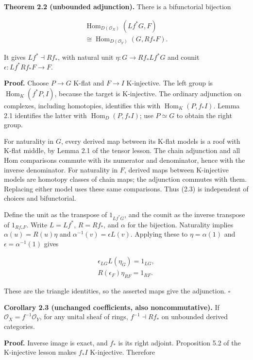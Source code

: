 \documentclass[
  english,
  11pt,
  a4paper,
]{article}
\begin{document}
\textbf{Theorem 2.2 (unbounded adjunction).} There is a bifunctorial
bijection

\[\begin{gathered}
\operatorname{Hom}_{D(\mathcal O_X)}(Lf^*G,F)
\\ \cong\operatorname{Hom}_{D(\mathcal O_Y)}(G,Rf_*F).
\end{gathered}
\tag{2.3}\]

It gives \(Lf^*\dashv Rf_*\), with natural unit \(\eta:G\to Rf_*Lf^*G\)
and counit \(\epsilon:Lf^*Rf_*F\to F\).

\textbf{Proof.} Choose \(P\to G\) K-flat and \(F\to I\) K-injective. The
left group is \(\operatorname{Hom}_K(f^*P,I)\), because the target is
K-injective. The ordinary adjunction on complexes, including homotopies,
identifies this with \(\operatorname{Hom}_K(P,f_*I)\). Lemma 2.1
identifies the latter with \(\operatorname{Hom}_D(P,f_*I)\); use
\(P\simeq G\) to obtain the right group.

For naturality in \(G\), every derived map between its K-flat models is
a roof with K-flat middle, by Lemma 2.1 of the tensor lesson. The chain
adjunction and all Hom comparisons commute with its numerator and
denominator, hence with the inverse denominator. For naturality in
\(F\), derived maps between K-injective models are homotopy classes of
chain maps; the adjunction commutes with them. Replacing either model
uses these same comparisons. Thus (2.3) is independent of choices and
bifunctorial.

Define the unit as the transpose of \(1_{Lf^*G}\), and the counit as the
inverse transpose of \(1_{Rf_*F}\). Write \(L=Lf^*\), \(R=Rf_*\), and
\(\alpha\) for the bijection. Naturality implies \(\alpha(u)=R(u)\eta\)
and \(\alpha^{-1}(v)=\epsilon L(v)\). Applying these to
\(\eta=\alpha(1)\) and \(\epsilon=\alpha^{-1}(1)\) gives

\[\begin{gathered}
\epsilon_{LG}L(\eta_G)=1_{LG},\\
R(\epsilon_F)\eta_{RF}=1_{RF}.
\end{gathered}
\tag{2.4}\]

These are the triangle identities, so the asserted maps give the
adjunction. \(\square\)

\textbf{Corollary 2.3 (unchanged coefficients, also noncommutative).} If
\(\mathcal O_X=f^{-1}\mathcal O_Y\), for any unital sheaf of rings,
\(f^{-1}\dashv Rf_*\) on unbounded derived categories.

\textbf{Proof.} Inverse image is exact, and \(f_*\) is its right
adjoint. Proposition 5.2 of the K-injective lesson makes \(f_*I\)
K-injective. Therefore
\end{document}

